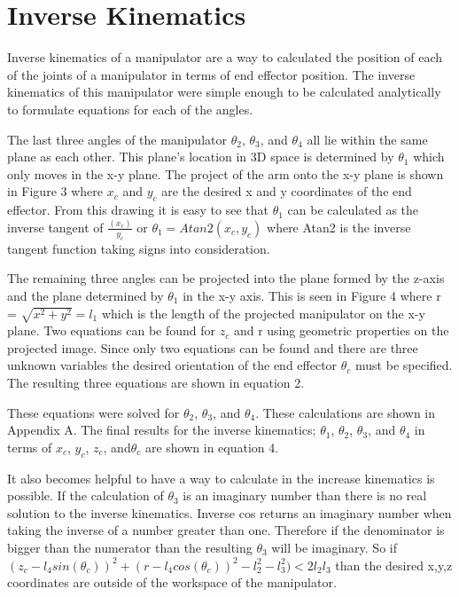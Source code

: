\documentclass[letterpaper,12pt]{report}
\begin{document}
\section{Inverse Kinematics}
Inverse kinematics of a manipulator are a way to calculated the position of each of the joints of a manipulator in terms of end effector position. The inverse kinematics of this manipulator were simple enough to be calculated analytically to formulate equations for each of the angles. 

The last three angles of the manipulator $\theta_2$, $\theta_3$, and $\theta_4$ all lie within the same plane as each other. This plane's location in 3D space is determined by $\theta_1$ which only moves in the x-y plane. The project of the arm onto the x-y plane is shown in Figure 3 where $x_c$ and $y_c$ are the desired x and y coordinates of the end effector. From this drawing it is easy to see that $\theta_1$ can be calculated as the inverse tangent of $\frac{(x_c)}{y_c}$ or $\theta_1 = Atan2(x_c,y_c)$ where Atan2 is the inverse tangent function taking signs into consideration.

The remaining three angles can be projected into the plane formed by the z-axis and the plane determined by $\theta_1$ in the x-y axis. This is seen in Figure 4 where r = $\sqrt{x^2+y^2} =l_1$ which is the length of the projected manipulator on the x-y plane. Two equations can be found for $z_c$ and r using geometric properties on the projected image. Since only two equations can be found and there are three unknown variables the desired orientation of the end effector $\theta_c$ must be specified. The resulting three equations are shown in equation 2.

These equations were solved for $\theta_2$, $\theta_3$, and $\theta_4$. These calculations are shown in Appendix A. The final results for the inverse kinematics; $\theta_1$, $\theta_2$, $\theta_3$, and $\theta_4$ in terms of $x_c$, $y_c$, $z_c$, and$\theta_c$ are shown in equation 4.

It also becomes helpful to have a way to calculate in the increase kinematics is possible. If the calculation of $\theta_3$ is an imaginary number than there is no real solution to the inverse kinematics. Inverse cos returns an imaginary number when taking the inverse of a number greater than one. Therefore if the denominator is bigger than the numerator than the resulting $\theta_3$ will be imaginary. So if $(z_c-l_4sin(\theta_c))^2 + (r-l_4cos(\theta_c))^2 - l_2^2 - l_3^2) < 2l_2l_3$ than the desired x,y,z coordinates are outside of the workspace of the manipulator. 
\end{document}
